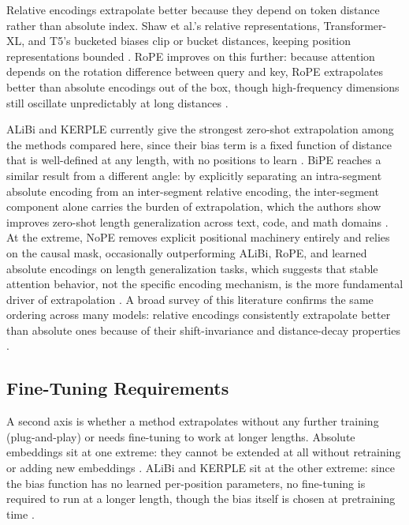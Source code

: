 \documentclass[conference]{IEEEtran}
\begin{document}
Relative encodings extrapolate better because they depend on token distance rather than absolute index. Shaw et al.'s relative representations, Transformer-XL, and T5's bucketed biases clip or bucket distances, keeping position representations bounded \cite{shaw2018,dai2019,raffel2020,press2022}. RoPE improves on this further: because attention depends on the rotation difference between query and key, RoPE extrapolates better than absolute encodings out of the box, though high-frequency dimensions still oscillate unpredictably at long distances \cite{su2024roformer,sun2022lex}.

ALiBi and KERPLE currently give the strongest zero-shot extrapolation among the methods compared here, since their bias term is a fixed function of distance that is well-defined at any length, with no positions to learn \cite{press2022,chi2022}. BiPE reaches a similar result from a different angle: by explicitly separating an intra-segment absolute encoding from an inter-segment relative encoding, the inter-segment component alone carries the burden of extrapolation, which the authors show improves zero-shot length generalization across text, code, and math domains \cite{he2024bipe}. At the extreme, NoPE removes explicit positional machinery entirely and relies on the causal mask, occasionally outperforming ALiBi, RoPE, and learned absolute encodings on length generalization tasks, which suggests that stable attention behavior, not the specific encoding mechanism, is the more fundamental driver of extrapolation \cite{kazemnejad2023}. A broad survey of this literature confirms the same ordering across many models: relative encodings consistently extrapolate better than absolute ones because of their shift-invariance and distance-decay properties \cite{zhao2024survey}.

\subsection{Fine-Tuning Requirements}

A second axis is whether a method extrapolates without any further training (plug-and-play) or needs fine-tuning to work at longer lengths. Absolute embeddings sit at one extreme: they cannot be extended at all without retraining or adding new embeddings \cite{press2022}. ALiBi and KERPLE sit at the other extreme: since the bias function has no learned per-position parameters, no fine-tuning is required to run at a longer length, though the bias itself is chosen at pretraining time \cite{press2022,chi2022}.
\end{document}
